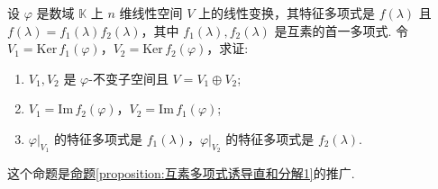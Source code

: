 \documentclass[../../main.tex]{subfiles}%
\begin{document}
\begin{proposition}\label{proposition:Cayley-Hamilton定理诱导直和分解(互素多项式命题推广)}
设 $\varphi$ 是数域 $\mathbb{K}$ 上 $n$ 维线性空间 $V$ 上的线性变换，其特征多项式是 $f(\lambda)$ 且 $f(\lambda)=f_1(\lambda)f_2(\lambda)$，其中 $f_1(\lambda),f_2(\lambda)$ 是互素的首一多项式. 令 $V_1 = \mathrm{Ker}\,f_1(\varphi)$，$V_2 = \mathrm{Ker}\,f_2(\varphi)$，求证:
\begin{enumerate}[(1)]
\item  $V_1,V_2$ 是 $\varphi$-不变子空间且 $V = V_1\oplus V_2$;

\item $V_1 = \mathrm{Im}\,f_2(\varphi)$，$V_2 = \mathrm{Im}\,f_1(\varphi)$;

\item $\varphi|_{V_1}$ 的特征多项式是 $f_1(\lambda)$，$\varphi|_{V_2}$ 的特征多项式是 $f_2(\lambda)$.
\end{enumerate}
\end{proposition}
\begin{note}
这个命题是\hyperref[proposition:互素多项式诱导直和分解1]{命题\ref{proposition:互素多项式诱导直和分解1}}的推广. 
\end{note}
\end{document}
